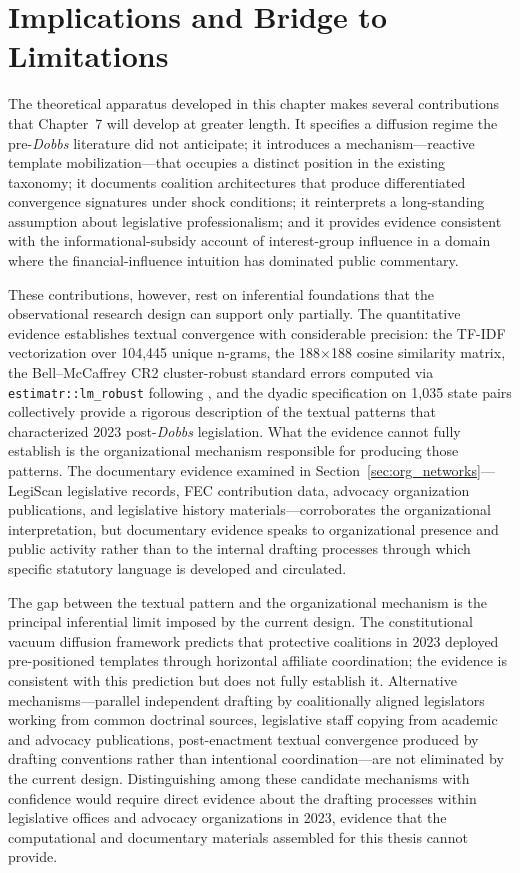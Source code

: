 \section{Implications and Bridge to Limitations}
\label{sec:bridge}
 
The theoretical apparatus developed in this chapter makes several contributions that Chapter~7 will develop at greater length. It specifies a diffusion regime the pre-\textit{Dobbs} literature did not anticipate; it introduces a mechanism---reactive template mobilization---that occupies a distinct position in the existing taxonomy; it documents coalition architectures that produce differentiated convergence signatures under shock conditions; it reinterprets a long-standing assumption about legislative professionalism; and it provides evidence consistent with the informational-subsidy account of interest-group influence in a domain where the financial-influence intuition has dominated public commentary.
 
These contributions, however, rest on inferential foundations that the observational research design can support only partially. The quantitative evidence establishes textual convergence with considerable precision: the TF-IDF vectorization over 104,445 unique n-grams, the 188$\times$188 cosine similarity matrix, the Bell--McCaffrey CR2 cluster-robust standard errors computed via \texttt{estimatr::lm\_robust} following \textcite{pustejovskyCRVEAnywhere2018}, and the dyadic specification on 1,035 state pairs collectively provide a rigorous description of the textual patterns that characterized 2023 post-\textit{Dobbs} legislation. What the evidence cannot fully establish is the organizational mechanism responsible for producing those patterns. The documentary evidence examined in Section~\ref{sec:org_networks}---LegiScan legislative records, FEC contribution data, advocacy organization publications, and legislative history materials---corroborates the organizational interpretation, but documentary evidence speaks to organizational presence and public activity rather than to the internal drafting processes through which specific statutory language is developed and circulated.
 
The gap between the textual pattern and the organizational mechanism is the principal inferential limit imposed by the current design. The constitutional vacuum diffusion framework predicts that protective coalitions in 2023 deployed pre-positioned templates through horizontal affiliate coordination; the evidence is consistent with this prediction but does not fully establish it. Alternative mechanisms---parallel independent drafting by coalitionally aligned legislators working from common doctrinal sources, legislative staff copying from academic and advocacy publications, post-enactment textual convergence produced by drafting conventions rather than intentional coordination---are not eliminated by the current design. Distinguishing among these candidate mechanisms with confidence would require direct evidence about the drafting processes within legislative offices and advocacy organizations in 2023, evidence that the computational and documentary materials assembled for this thesis cannot provide.
 
